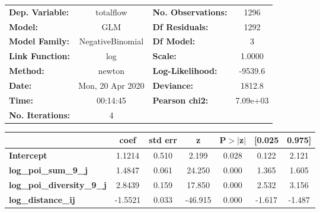 \begin{center}
\begin{tabular}{lclc}
\toprule
\textbf{Dep. Variable:}            &    totalflow     & \textbf{  No. Observations:  } &     1296    \\
\textbf{Model:}                    &       GLM        & \textbf{  Df Residuals:      } &     1292    \\
\textbf{Model Family:}             & NegativeBinomial & \textbf{  Df Model:          } &        3    \\
\textbf{Link Function:}            &       log        & \textbf{  Scale:             } &    1.0000   \\
\textbf{Method:}                   &      newton      & \textbf{  Log-Likelihood:    } &   -9539.6   \\
\textbf{Date:}                     & Mon, 20 Apr 2020 & \textbf{  Deviance:          } &    1812.8   \\
\textbf{Time:}                     &     00:14:45     & \textbf{  Pearson chi2:      } &  7.09e+03   \\
\textbf{No. Iterations:}           &        4         & \textbf{                     } &             \\
\bottomrule
\end{tabular}
\begin{tabular}{lcccccc}
                                   & \textbf{coef} & \textbf{std err} & \textbf{z} & \textbf{P$> |$z$|$} & \textbf{[0.025} & \textbf{0.975]}  \\
\midrule
\textbf{Intercept}                 &       1.1214  &        0.510     &     2.199  &         0.028        &        0.122    &        2.121     \\
\textbf{log\_poi\_sum\_9\_j}       &       1.4847  &        0.061     &    24.250  &         0.000        &        1.365    &        1.605     \\
\textbf{log\_poi\_diversity\_9\_j} &       2.8439  &        0.159     &    17.850  &         0.000        &        2.532    &        3.156     \\
\textbf{log\_distance\_ij}         &      -1.5521  &        0.033     &   -46.915  &         0.000        &       -1.617    &       -1.487     \\
\bottomrule
\end{tabular}
\end{center}